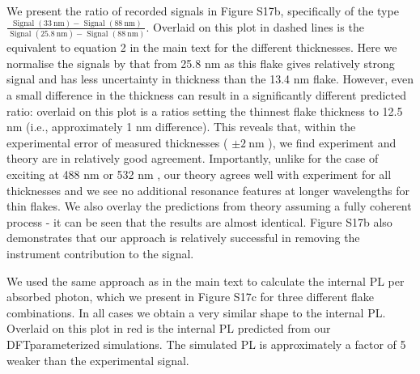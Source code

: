 \documentclass[10pt]{article}
\begin{document}
We present the ratio of recorded signals in Figure S17b, specifically of the type $\frac{\text { Signal }(33 \mathrm{~nm})-\text { Signal }(88 \mathrm{~nm})}{\text { Signal }(25.8 \mathrm{~nm})-\text { Signal }(88 \mathrm{~nm})}$. Overlaid on this plot in dashed lines is the equivalent to equation 2 in the main text for the different thicknesses. Here we normalise the signals by that from 25.8 nm as this flake gives relatively strong signal and has less uncertainty in thickness than the 13.4 nm flake. However, even a small difference in the thickness can result in a significantly different predicted ratio: overlaid on this plot is a ratios setting the thinnest flake thickness to 12.5 nm (i.e., approximately 1 nm difference). This reveals that, within the experimental error of measured thicknesses ( $\pm 2 \mathrm{~nm}$ ), we find experiment and theory are in relatively good agreement. Importantly, unlike for the case of exciting at 488 nm or 532 nm , our theory agrees well with experiment for all thicknesses and we see no additional resonance features at longer wavelengths for thin flakes. We also overlay the predictions from theory assuming a fully coherent process - it can be seen that the results are almost identical. Figure S17b also\\
demonstrates that our approach is relatively successful in removing the instrument contribution to the signal.

We used the same approach as in the main text to calculate the internal PL per absorbed photon, which we present in Figure S17c for three different flake combinations. In all cases we obtain a very similar shape to the internal PL. Overlaid on this plot in red is the internal PL predicted from our DFTparameterized simulations. The simulated PL is approximately a factor of 5 weaker than the experimental signal.
\end{document}
